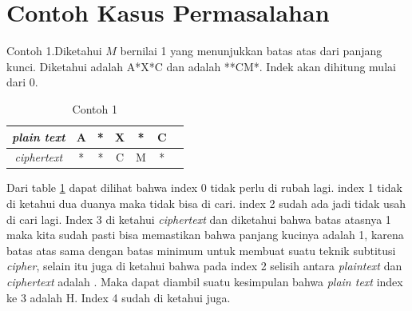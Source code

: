 	\section{Contoh Kasus Permasalahan}
	Contoh 1.Diketahui $M$ bernilai 1 yang menunjukkan batas atas dari panjang kunci. Diketahui \plaintext adalah A*X*C dan \ciphertext adalah **CM*. Indek akan dihitung mulai dari 0. 
	\begin{table}[H]
	 	\centering
	 	\begin{tabular}{|c|c|c|c|c|c|c|}\hline
	 	\textit{plain text}&A&*&X&*&C\\ \hline
	 	\textit{ciphertext}&*&*&C&M&*\\ \hline
	 	\end{tabular}
	 	\caption{Contoh 1}
	 	\label{tab:contoh1}
	\end{table}
	 Dari table \ref{tab:contoh1} dapat dilihat bahwa index 0 tidak perlu di rubah lagi. index 1 tidak di ketahui dua duanya maka tidak bisa di cari. index 2 sudah ada jadi tidak usah di cari lagi. Index 3 di ketahui \textit{ciphertext} dan diketahui bahwa batas atasnya 1 maka kita sudah pasti bisa memastikan bahwa panjang kucinya adalah 1, karena batas atas sama dengan batas minimum untuk membuat suatu teknik subtitusi \textit{cipher}, selain itu juga di ketahui bahwa pada index 2 selisih antara \textit{plaintext} dan \textit{ciphertext} adalah . Maka dapat diambil suatu kesimpulan bahwa \textit{plain text} index ke 3 adalah H. Index 4 sudah di ketahui juga. 
	 
